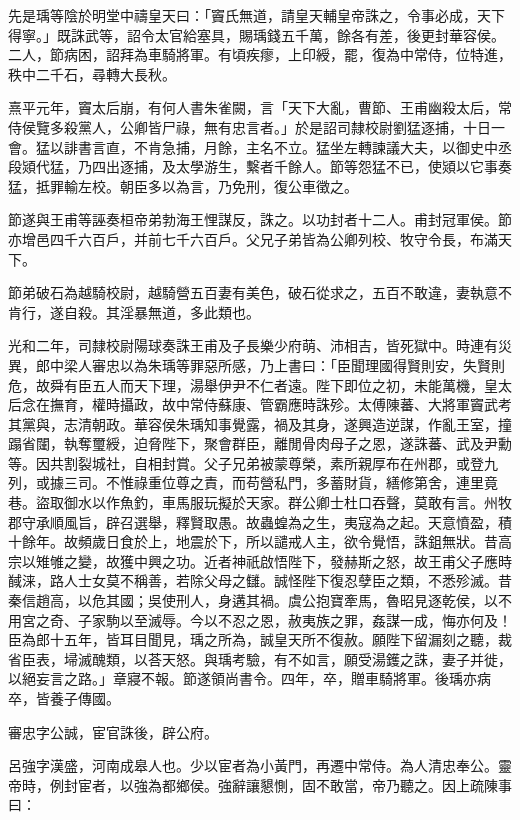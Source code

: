 \begin{pinyinscope}
先是瑀等陰於明堂中禱皇天曰：「竇氏無道，請皇天輔皇帝誅之，令事必成，天下得寧。」既誅武等，詔令太官給塞具，賜瑀錢五千萬，餘各有差，後更封華容侯。二人，節病困，詔拜為車騎將軍。有頃疾瘳，上印綬，罷，復為中常侍，位特進，秩中二千石，尋轉大長秋。

熹平元年，竇太后崩，有何人書朱雀闕，言「天下大亂，曹節、王甫幽殺太后，常侍侯覽多殺黨人，公卿皆尸祿，無有忠言者。」於是詔司隸校尉劉猛逐捕，十日一會。猛以誹書言直，不肯急捕，月餘，主名不立。猛坐左轉諫議大夫，以御史中丞段熲代猛，乃四出逐捕，及太學游生，繫者千餘人。節等怨猛不已，使熲以它事奏猛，抵罪輸左校。朝臣多以為言，乃免刑，復公車徵之。

節遂與王甫等誣奏桓帝弟勃海王悝謀反，誅之。以功封者十二人。甫封冠軍侯。節亦增邑四千六百戶，并前七千六百戶。父兄子弟皆為公卿列校、牧守令長，布滿天下。

節弟破石為越騎校尉，越騎營五百妻有美色，破石從求之，五百不敢違，妻執意不肯行，遂自殺。其淫暴無道，多此類也。

光和二年，司隸校尉陽球奏誅王甫及子長樂少府萌、沛相吉，皆死獄中。時連有災異，郎中梁人審忠以為朱瑀等罪惡所感，乃上書曰：「臣聞理國得賢則安，失賢則危，故舜有臣五人而天下理，湯舉伊尹不仁者遠。陛下即位之初，未能萬機，皇太后念在撫育，權時攝政，故中常侍蘇康、管霸應時誅殄。太傅陳蕃、大將軍竇武考其黨與，志清朝政。華容侯朱瑀知事覺露，禍及其身，遂興造逆謀，作亂王室，撞蹋省闥，執奪璽綬，迫脅陛下，聚會群臣，離閒骨肉母子之恩，遂誅蕃、武及尹勳等。因共割裂城社，自相封賞。父子兄弟被蒙尊榮，素所親厚布在州郡，或登九列，或據三司。不惟祿重位尊之責，而苟營私門，多蓄財貨，繕修第舍，連里竟巷。盜取御水以作魚釣，車馬服玩擬於天家。群公卿士杜口吞聲，莫敢有言。州牧郡守承順風旨，辟召選舉，釋賢取愚。故蟲蝗為之生，夷寇為之起。天意憤盈，積十餘年。故頻歲日食於上，地震於下，所以譴戒人主，欲令覺悟，誅鉏無狀。昔高宗以雉雊之變，故獲中興之功。近者神祇啟悟陛下，發赫斯之怒，故王甫父子應時馘涞，路人士女莫不稱善，若除父母之讎。誠怪陛下復忍孽臣之類，不悉殄滅。昔秦信趙高，以危其國；吳使刑人，身遘其禍。虞公抱寶牽馬，魯昭見逐乾侯，以不用宮之奇、子家駒以至滅辱。今以不忍之恩，赦夷族之罪，姦謀一成，悔亦何及！臣為郎十五年，皆耳目聞見，瑀之所為，誠皇天所不復赦。願陛下留漏刻之聽，裁省臣表，埽滅醜類，以荅天怒。與瑀考驗，有不如言，願受湯鑊之誅，妻子并徙，以絕妄言之路。」章寢不報。節遂領尚書令。四年，卒，贈車騎將軍。後瑀亦病卒，皆養子傳國。

審忠字公誠，宦官誅後，辟公府。

呂強字漢盛，河南成皋人也。少以宦者為小黃門，再遷中常侍。為人清忠奉公。靈帝時，例封宦者，以強為都鄉侯。強辭讓懇惻，固不敢當，帝乃聽之。因上疏陳事曰：


\end{pinyinscope}
